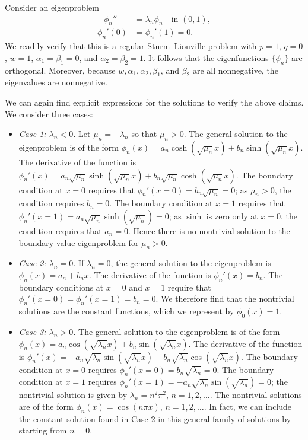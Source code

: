 \begin{example}
    Consider an eigenproblem
    \begin{align*}
        -\phi_n'' &= \lambda_n \phi_n \quad \text{in } (0, 1), \\
        \phi_n'(0) &= \phi_n'(1) = 0.
    \end{align*}
    We readily verify that this is a regular Sturm--Liouville problem with $p = 1$, $q = 0$, $w = 1$, $\alpha_1 = \beta_1 = 0$, and $\alpha_2 = \beta_2 = 1$. It follows that the eigenfunctions $\{\phi_n\}$ are orthogonal. Moreover, because $w, \alpha_1, \alpha_2, \beta_1$, and $\beta_2$ are all nonnegative, the eigenvalues are nonnegative.

    We can again find explicit expressions for the solutions to verify the above claims. We consider three cases:
    \begin{itemize}
        \item \textit{Case 1: $\lambda_n < 0$.} Let $\mu_n = -\lambda_n$ so that $\mu_n > 0$. The general solution to the eigenproblem is of the form $\phi_n(x) = a_n \cosh(\sqrt{\mu_n} x) + b_n \sinh(\sqrt{\mu_n} x)$. The derivative of the function is $\phi_n'(x) = a_n \sqrt{\mu_n} \sinh(\sqrt{\mu_n} x) + b_n \sqrt{\mu_n} \cosh(\sqrt{\mu_n} x)$. The boundary condition at $x = 0$ requires that $\phi_n'(x = 0) = b_n \sqrt{\mu_n} = 0$; as $\mu_n > 0$, the condition requires $b_n = 0$. The boundary condition at $x = 1$ requires that $\phi_n'(x = 1) = a_n \sqrt{\mu_n} \sinh(\sqrt{\mu_n}) = 0$; as $\sinh$ is zero only at $x = 0$, the condition requires that $a_n = 0$. Hence there is no nontrivial solution to the boundary value eigenproblem for $\mu_n > 0$.
        \item \textit{Case 2: $\lambda_n = 0$.} If $\lambda_n = 0$, the general solution to the eigenproblem is $\phi_n(x) = a_n + b_n x$. The derivative of the function is $\phi_n'(x) = b_n$. The boundary conditions at $x = 0$ and $x = 1$ require that $\phi_n'(x = 0) = \phi_n'(x = 1) = b_n = 0$. We therefore find that the nontrivial solutions are the constant functions, which we represent by $\phi_0(x) = 1$.
        \item \textit{Case 3: $\lambda_n > 0$.} The general solution to the eigenproblem is of the form $\phi_n(x) = a_n \cos(\sqrt{\lambda_n} x) + b_n \sin(\sqrt{\lambda_n} x)$. The derivative of the function is $\phi_n'(x) = -a_n \sqrt{\lambda_n} \sin(\sqrt{\lambda_n} x) + b_n \sqrt{\lambda_n} \cos(\sqrt{\lambda_n} x)$. The boundary condition at $x = 0$ requires $\phi_n'(x = 0) = b_n \sqrt{\lambda_n} = 0$. The boundary condition at $x = 1$ requires $\phi_n'(x = 1) = -a_n \sqrt{\lambda_n} \sin(\sqrt{\lambda_n}) = 0$; the nontrivial solution is given by $\lambda_n = n^2\pi^2$, $n = 1, 2, \dots$. The nontrivial solutions are of the form $\phi_n(x) = \cos(n\pi x)$, $n = 1, 2, \dots$. In fact, we can include the constant solution found in Case 2 in this general family of solutions by starting from $n = 0$.

\end{itemize}
\end{example}
